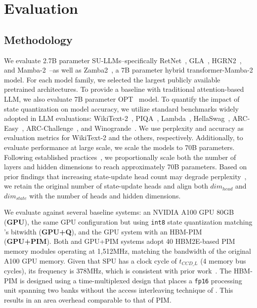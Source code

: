\section{Evaluation}
\label{sec:evaluation}
%
\subsection{Methodology}
\label{sec:method}

%
%
We evaluate 2.7B parameter SU-LLMs--specifically
RetNet~\cite{retnet}, GLA~\cite{gated_linear_attention},
HGRN2~\cite{hgrn2}, and Mamba-2~\cite{mamba2}--as well as
Zamba2~\cite{zamba2}, a 7B parameter hybrid transformer-Mamba-2 model.
%
For each model family, we selected the largest publicly available
pretrained architectures.
%
To provide a baseline with traditional attention-based LLM,
we also evaluate 7B parameter OPT~\cite{zhang2022opt} model.
%
To quantify the impact of state quantization on model accuracy, we
utilize standard benchmarks widely adopted in LLM evaluations:
WikiText-2~\cite{merity2016pointer}, PIQA~\cite{Bisk2020},
Lambda~\cite{paperno-EtAl:2016:P16-1},
HellaSwag~\cite{zellers2019hellaswag}, ARC-Easy~\cite{allenai:arc},
ARC-Challenge~\cite{allenai:arc}, and Winogrande~\cite{sakaguchi2021winogrande}.
%
We use perplexity and accuracy as evaluation metrics for WikiText-2
and the others, respectively.
%
Additionally, to evaluate performance at large scale, we scale the
models to 70B parameters.
%
Following established practices~\cite{scaling_laws}, we
proportionally scale both the number of layers and hidden dimensions
to reach approximately 70B parameters.
%
Based on prior findings that increasing state-update head count may
degrade perplexity~\cite{gated_linear_attention}, we retain the
original number of state-update heads and align both $dim_{head}$ and
$dim_{state}$ with the number of heads and hidden dimensions.
%

%
%
We evaluate \sysname{} against several baseline systems: an NVIDIA A100
GPU 80GB (\textbf{GPU}), the same GPU configuration but using
\texttt{int8} state quantization matching \sysname{}'s bitwidth
(\textbf{GPU+Q}), and the GPU system with an HBM-PIM~\cite{hbm_pim}
(\textbf{GPU+PIM}).
%
Both \sysname{} and GPU+PIM systems adopt 40 HBM2E-based PIM memory
modules operating at 1,512MHz, matching the bandwidth of the original
A100 GPU memory.
%
Given that SPU has a clock cycle of $t_{CCD\_L}$ (4 memory
bus cycles), its frequency is 378MHz, which is consistent with prior
work~\cite{hbm_pim}.
%
The HBM-PIM is designed using a time-multiplexed design that places a
\texttt{fp16} processing unit spanning two banks without the access
interleaving technique of \sysname{}.
%
This results in an area overhead comparable to that of \sysname{} PIM.
%

